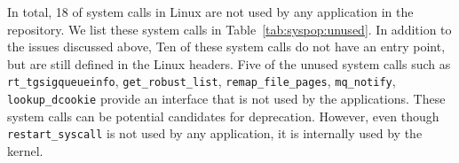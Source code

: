 






In total, 18 of \syscallnum{} system calls in Linux  are not used by any application in the \osdist{} repository. We list these system calls in Table~\ref{tab:syspop:unused}.
In addition to the issues discussed above,
Ten of these system calls do not have an entry point, but are still defined in the Linux headers.
Five of the unused system calls such as {\tt rt\_tgsig\linebreak[0]queueinfo}, {\tt get\_robust\_list}, {\tt remap\_\linebreak[0]file\_pages}, {\tt mq\_notify}, {\tt lookup\_dcookie} provide an interface that is not used by the applications. These system calls can be potential candidates for deprecation.
However, even though {\tt restart\_\linebreak[0]syscall} is not used by any application, it is internally used by the kernel. %

